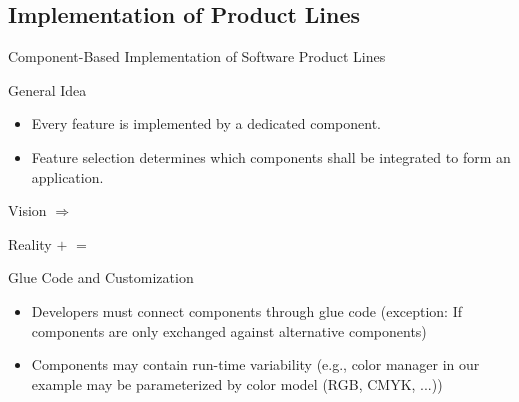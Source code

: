 \subsection{Implementation of Product Lines}
\begin{frame}{Component-Based Implementation of Software Product Lines}
	\begin{mycolumns}[widths={40,60}]
		\begin{definition}{General Idea}					
			\begin{itemize}
				\item Every feature is implemented by a dedicated component.
				\item Feature selection determines which components shall be integrated to form an application.				
			\end{itemize}
		\end{definition}
		\begin{example}{Vision}
				\vspace*{\fill}
					$\Longrightarrow$ 
				\vspace*{\fill}	
		\end{example}
	\mynextcolumn
		\begin{example}{Reality}
				\vspace*{\fill}
					$+$ 
				\vspace*{\fill}	
				\vspace*{\fill}
					$=$ 
				\vspace*{\fill}	
		\end{example}		
		\begin{note}{Glue Code and Customization}
			\begin{itemize}
				\item Developers must connect components through glue code (exception: If components are only exchanged against alternative components)
				\item Components may contain run-time variability (e.g., color manager in our example may be parameterized by color model (RGB, CMYK, ...))
			\end{itemize}
		\end{note}
	\end{mycolumns}	
\end{frame}

